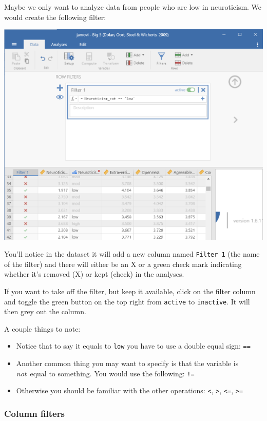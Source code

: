\documentclass[
]{book}
\begin{document}
Maybe we only want to analyze data from people who are low in neuroticism. We would create the following filter:

\includegraphics{images/03-jamovi/filter-row.png}

You'll notice in the dataset it will add a new column named \texttt{Filter\ 1} (the name of the filter) and there will either be an X or a green check mark indicating whether it's removed (X) or kept (check) in the analyses.

If you want to take off the filter, but keep it available, click on the filter column and toggle the green button on the top right from \texttt{active} to \texttt{inactive}. It will then grey out the column.

A couple things to note:

\begin{itemize}
\item
  Notice that to say it equals to \texttt{low} you have to use a double equal sign: \texttt{==}
\item
  Another common thing you may want to specify is that the variable is \emph{not}~equal to something. You would use the following: \texttt{!=}
\item
  Otherwise you should be familiar with the other operations: \texttt{\textless{}}, \texttt{\textgreater{}}, \texttt{\textless{}=}, \texttt{\textgreater{}=}
\end{itemize}

\hypertarget{column-filters}{%
\subsubsection{Column filters}\label{column-filters}}
\end{document}

